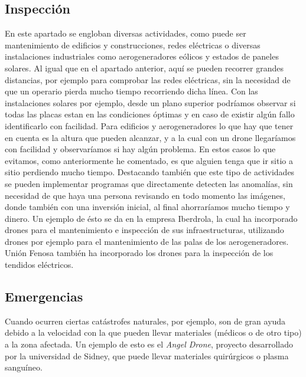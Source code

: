 	\subsection{Inspecci\'on} 
\hspace{1 cm}En este apartado se engloban diversas actividades, como puede ser mantenimiento de edificios y construcciones, redes el\'ectricas o diversas instalaciones industriales como aerogeneradores e\'olicos y estados de paneles solares. Al igual que en el apartado anterior, aqu\'i se pueden recorrer grandes distancias, por ejemplo para comprobar las redes el\'ectricas, sin la necesidad de que un operario pierda mucho tiempo recorriendo dicha l\'inea. Con las instalaciones solares por ejemplo, desde un plano superior podr\'iamos observar si todas las placas estan en las condiciones \'optimas y en caso de existir alg\'un fallo identificarlo con facilidad. Para edificios y aerogeneradores lo que hay que tener en cuenta es la altura que pueden alcanzar, y a la cual con un drone llegar\'iamos con facilidad y observar\'iamos si hay alg\'un problema. En estos casos lo que evitamos, como anteriormente he comentado, es que alguien tenga que ir sitio a sitio perdiendo mucho tiempo. Destacando tambi\'en que este tipo de actividades se pueden implementar programas que directamente detecten las anomal\'ias, sin necesidad de que haya una persona revisando en todo momento las im\'agenes, donde tambi\'en con una inversi\'on inicial, al final ahorrar\'iamos mucho tiempo y dinero. Un ejemplo de \'esto se da en la empresa Iberdrola, la cual ha incorporado drones para el mantenimiento e inspecci\'on de sus infraestructuras, utilizando drones por ejemplo para el mantenimiento de las palas de los aerogeneradores. Uni\'on Fenosa tambi\'en ha incorporado los drones para la inspecci\'on de los tendidos el\'ectricos. 


	\subsection{Emergencias}
\hspace{1 cm} Cuando ocurren ciertas cat\'astrofes naturales, por ejemplo, son de gran ayuda debido a la velocidad con la que pueden llevar materiales (m\'edicos o de otro tipo) a la zona afectada. Un ejemplo de esto es el \textit{Angel Drone}, proyecto desarrollado por la universidad de Sidney, que puede llevar materiales quir\'urgicos o plasma sangu\'ineo.

